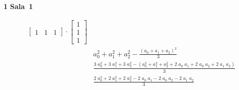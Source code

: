 \documentclass{article}
\newcounter{exe-list}
\newenvironment{exe}[2][Sala]
    {\bigskip\noindent\par\ifthenelse{\equal{#1}{}}%
        {\textbf{\LARGE #2}}%
        {\textbf{\LARGE #1~#2}}%
    \medskip\noindent\par}
    {\bigskip}
\begin{document}
\begin{exe}{1}
\begin{align*}
{\begin{bmatrix}
                    1 & 1 & 1
                \end{bmatrix} \cdot \begin{bmatrix}
                    1 \\ 1 \\ 1
                \end{bmatrix}
            } \\
        & a_0^2 + a_1^2 + a_2^2
            - \frac{(a_0 + a_1 + a_2)^2}{3} \\
        & \frac{3 \; a_0^2 + 3 \; a_1^2 + 3 \; a_2^2
            - (a_0^2 + a_1^2 + a_2^2
                + 2 \; a_0 \; a_1
                + 2 \; a_0 \; a_2
                + 2 \; a_1 \; a_2)
            }{3} \\
        & \frac{2 \; a_0^2 + 2 \; a_1^2 + 2 \; a_2^2
            - 2 \; a_0 \; a_1
            - 2 \; a_0 \; a_2
            - 2 \; a_1 \; a_2
            }{3} \\
    \end{align*}
\end{exe}
\end{document}
